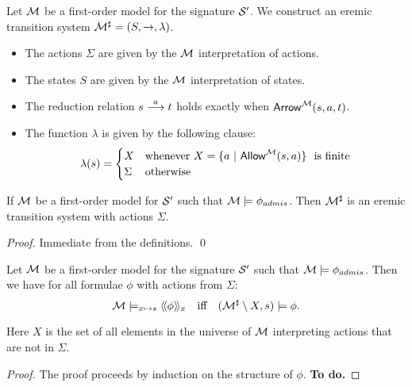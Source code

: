 \begin{definition}
Let $\mathcal{M}$ be a first-order model for the signature $\mathcal{S}'$.
We construct an eremic transition system
$\mathcal{M}^{\sharp} = (S, \rightarrow, \lambda)$.
\begin{itemize}

\item The actions $\Sigma$ are given by the $\mathcal{M}$ interpretation of actions.

\item The states $S$ are given by the $\mathcal{M}$ interpretation of states.

\item The reduction relation $s \stackrel{a}{\longrightarrow} t$ holds exactly when
  $\mathsf{Arrow}^{\mathcal{M}}(s, a, t)$.

\item The function $\lambda$ is given by the following clause:
  \[
     \lambda(s) 
        =
     \begin{cases} 
       X & \text{whenever}\ X = \{a \ |\ \ALLOWED{\CAL{M}}{s}{a} \}\ \text{ is finite} \\
       \Sigma & \text{otherwise}
     \end{cases}
  \]

\end{itemize}

\end{definition}

\begin{lemma}
If $\mathcal{M}$ be a first-order model for $\mathcal{S}'$ such that $\mathcal{M}
\models \phi_{admis}$.  Then $\mathcal{M}^{\sharp}$ is an eremic
transition system with actions $\Sigma$.
\end{lemma}
\begin{proof}
Immediate from the definitions.
\qed
\end{proof}

\begin{theorem}\label{correspondence:theorem:223}
Let $\mathcal{M}$ be a first-order model for the signature $\mathcal{S}'$ such that
 $\mathcal{M} \models \phi_{admis}$.
Then we have for all \ELABR{} formulae $\phi$ with
actions from $\Sigma$:
\[
   \mathcal{M} \models_{x \mapsto s} \langle\!\langle \phi \rangle\!\rangle_x 
        \quad  \text{iff} \quad 
   (\mathcal{M}^{\sharp} \setminus X, s) \models \phi.
\]
\end{theorem}
Here $X$ is the set of all elements in the universe of $\mathcal{M}$ interpreting
actions that are not in $\Sigma$.
\begin{proof}
The proof proceeds by induction on the structure of $\phi$. \textbf{To do.}
\end{proof}


